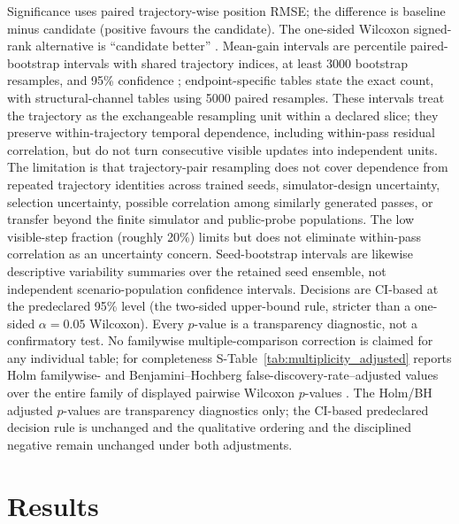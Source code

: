 \documentclass{article}
\begin{document}
Significance uses paired trajectory-wise position RMSE; the difference is baseline minus candidate (positive favours the candidate). The one-sided Wilcoxon signed-rank alternative is ``candidate better'' \cite{wilcoxon1945}. Mean-gain intervals are percentile paired-bootstrap intervals with shared trajectory indices, at least 3000 bootstrap resamples, and 95\% confidence \cite{efron1994}; endpoint-specific tables state the exact count, with structural-channel tables using 5000 paired resamples. These intervals treat the trajectory as the exchangeable resampling unit within a declared slice; they preserve within-trajectory temporal dependence, including within-pass residual correlation, but do not turn consecutive visible updates into independent units. The limitation is that trajectory-pair resampling does not cover dependence from repeated trajectory identities across trained seeds, simulator-design uncertainty, selection uncertainty, possible correlation among similarly generated passes, or transfer beyond the finite simulator and public-probe populations. The low visible-step fraction (roughly 20\%) limits but does not eliminate within-pass correlation as an uncertainty concern. Seed-bootstrap intervals are likewise descriptive variability summaries over the retained seed ensemble, not independent scenario-population confidence intervals. Decisions are CI-based at the predeclared 95\% level (the two-sided upper-bound rule, stricter than a one-sided $\alpha=0.05$ Wilcoxon). Every $p$-value is a transparency diagnostic, not a confirmatory test. No familywise multiple-comparison correction is claimed for any individual table; for completeness S-Table~\ref{tab:multiplicity_adjusted} reports Holm familywise- and Benjamini--Hochberg false-discovery-rate--adjusted values over the entire family of displayed pairwise Wilcoxon $p$-values \cite{holm1979,benjamini1995}. The Holm/BH adjusted $p$-values are transparency diagnostics only; the CI-based predeclared decision rule is unchanged and the qualitative ordering and the disciplined negative remain unchanged under both adjustments.

\section{Results}
\end{document}
